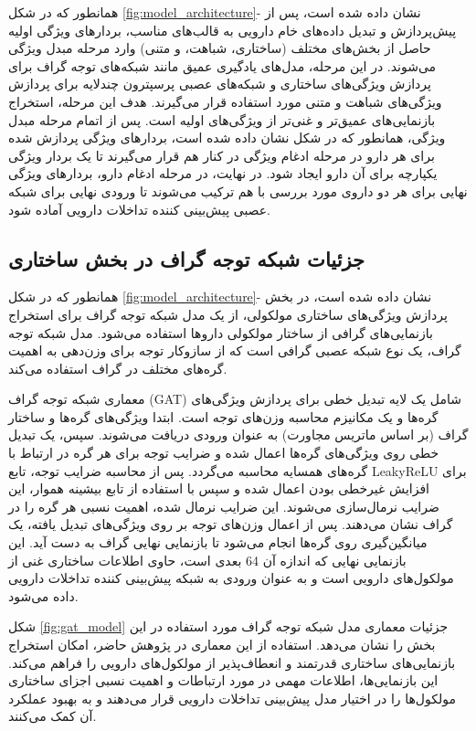 همانطور که در شکل \ref{fig:model_architecture}- نشان داده شده است، پس از پیش‌پردازش و تبدیل داده‌های خام دارویی به قالب‌های مناسب، بردارهای ویژگی اولیه حاصل از بخش‌های مختلف (ساختاری، شباهت، و متنی) وارد مرحله مبدل ویژگی می‌شوند. در این مرحله، مدل‌های یادگیری عمیق مانند شبکه‌های توجه گراف برای پردازش ویژگی‌های ساختاری و شبکه‌های عصبی پرسپترون چندلایه برای پردازش ویژگی‌های شباهت و متنی مورد استفاده قرار می‌گیرند. هدف این مرحله، استخراج بازنمایی‌های عمیق‌تر و غنی‌تر از ویژگی‌های اولیه است. پس از اتمام مرحله مبدل ویژگی، همانطور که در شکل نشان داده شده است، بردارهای ویژگی پردازش شده برای هر دارو در مرحله ادغام ویژگی در کنار هم قرار می‌گیرند تا یک بردار ویژگی یکپارچه برای آن دارو ایجاد شود. در نهایت، در مرحله ادغام دارو، بردارهای ویژگی نهایی برای هر دو داروی مورد بررسی با هم ترکیب می‌شوند تا ورودی نهایی برای شبکه عصبی پیش‌بینی کننده تداخلات دارویی آماده شود.


\subsection{جزئیات شبکه توجه گراف در بخش ساختاری}

همانطور که در شکل \ref{fig:model_architecture}- نشان داده شده است، در بخش پردازش ویژگی‌های ساختاری مولکولی، از یک مدل شبکه توجه گراف برای استخراج بازنمایی‌های گرافی از ساختار مولکولی داروها استفاده می‌شود. مدل شبکه توجه گراف، یک نوع شبکه عصبی گرافی است که از سازوکار توجه برای وزن‌دهی به اهمیت گره‌های مختلف در گراف استفاده می‌کند.

معماری شبکه توجه گراف (GAT) شامل یک لایه تبدیل خطی برای پردازش ویژگی‌های گره‌ها و یک مکانیزم محاسبه وزن‌های توجه است. ابتدا ویژگی‌های گره‌ها و ساختار گراف (بر اساس ماتریس مجاورت) به عنوان ورودی دریافت می‌شوند. سپس، یک تبدیل خطی روی ویژگی‌های گره‌ها اعمال شده و ضرایب توجه برای هر گره در ارتباط با گره‌های همسایه محاسبه می‌گردد. پس از محاسبه ضرایب توجه، تابع LeakyReLU برای افزایش غیرخطی بودن اعمال شده و سپس با استفاده از تابع بیشینه هموار، این ضرایب نرمال‌سازی می‌شوند. این ضرایب نرمال شده، اهمیت نسبی هر گره را در گراف نشان می‌دهند. پس از اعمال وزن‌های توجه بر روی ویژگی‌های تبدیل یافته، یک میانگین‌گیری روی گره‌ها انجام می‌شود تا بازنمایی نهایی گراف به دست آید. این بازنمایی نهایی که اندازه آن 64 بعدی است، حاوی اطلاعات ساختاری غنی از مولکول‌های دارویی است و به عنوان ورودی به شبکه پیش‌بینی کننده تداخلات دارویی داده می‌شود.

شکل \ref{fig:gat_model} جزئیات معماری مدل شبکه توجه گراف مورد استفاده در این بخش را نشان می‌دهد. استفاده از این معماری در پژوهش حاضر، امکان استخراج بازنمایی‌های ساختاری قدرتمند و انعطاف‌پذیر از مولکول‌های دارویی را فراهم می‌کند. این بازنمایی‌ها، اطلاعات مهمی در مورد ارتباطات و اهمیت نسبی اجزای ساختاری مولکول‌ها را در اختیار مدل پیش‌بینی تداخلات دارویی قرار می‌دهند و به بهبود عملکرد آن کمک می‌کنند.

